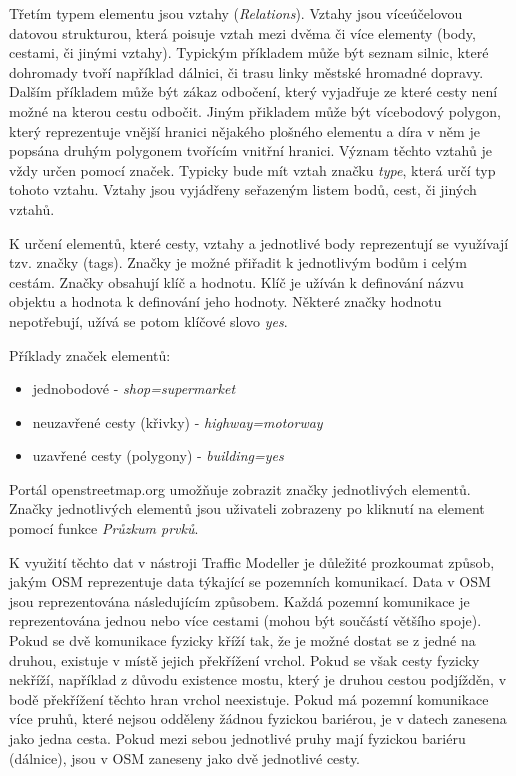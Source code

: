 Třetím typem elementu jsou vztahy (\textit{Relations}). Vztahy jsou víceúčelovou datovou strukturou, která poisuje vztah mezi dvěma či více elementy (body, cestami, či jinými vztahy). Typickým příkladem může být seznam silnic, které dohromady tvoří například dálnici, či trasu linky městské hromadné dopravy. Dalším příkladem může být zákaz odbočení, který vyjadřuje ze které cesty není možné na kterou cestu odbočit. Jiným přikladem může být vícebodový polygon, který reprezentuje vnější hranici nějakého plošného elementu a díra v něm je popsána druhým polygonem tvořícím vnitřní hranici. Význam těchto vztahů je vždy určen pomocí značek. Typicky bude mít vztah značku \textit{type}, která určí typ tohoto vztahu. Vztahy jsou vyjádřeny seřazeným listem bodů, cest, či jiných vztahů. 

K určení elementů, které cesty, vztahy a jednotlivé body reprezentují se využívají tzv. značky (tags). Značky je možné přiřadit k jednotlivým bodům i celým cestám. Značky obsahují klíč a hodnotu. Klíč je užíván k definování názvu objektu a hodnota k definování jeho hodnoty. Některé značky hodnotu nepotřebují, užívá se potom klíčové slovo \textit{yes}.

Příklady značek elementů:

\begin{itemize}
  \item jednobodové - \textit{shop=supermarket}
  \item neuzavřené cesty (křivky) - \textit{highway=motorway}
  \item uzavřené cesty (polygony) - \textit{building=yes}
\end{itemize}

Portál openstreetmap.org umožňuje zobrazit značky jednotlivých elementů. Značky jednotlivých elementů jsou uživateli zobrazeny po kliknutí na element pomocí funkce \textit{Průzkum prvků}. 

K využití těchto dat v nástroji Traffic Modeller je důležité prozkoumat způsob, jakým OSM reprezentuje data týkající se pozemních komunikací. Data v OSM jsou reprezentována následujícím způsobem. Každá pozemní komunikace je reprezentována jednou nebo více cestami (mohou být součástí většího spoje). Pokud se dvě komunikace fyzicky kříží tak, že je možné dostat se z jedné na druhou, existuje v místě jejich překřížení vrchol. Pokud se však  cesty fyzicky nekříží, například z důvodu existence mostu, který je druhou cestou podjížděn, v bodě překřížení těchto hran vrchol neexistuje. Pokud má pozemní komunikace více pruhů, které nejsou odděleny žádnou fyzickou bariérou, je v datech zanesena jako jedna cesta. Pokud mezi sebou jednotlivé pruhy mají fyzickou bariéru (dálnice), jsou v OSM zaneseny jako dvě jednotlivé cesty.

